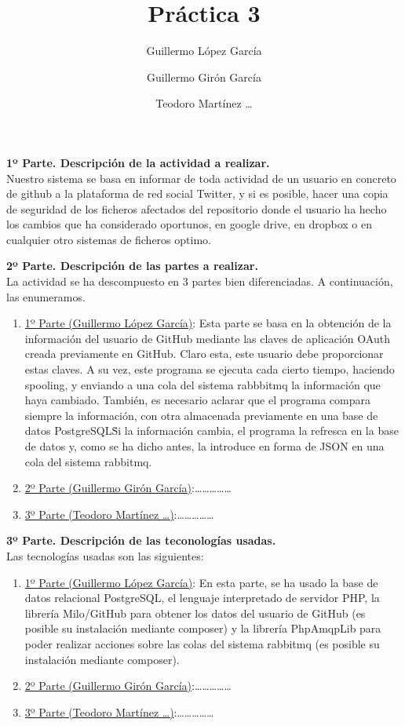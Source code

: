 \documentclass{article}
\title{Práctica 3}
\author{
Guillermo López García
\and
Guillermo Girón García
\and
Teodoro Martínez \ldots
}
\begin{document}
\maketitle
\textbf{1º Parte. Descripción de la actividad a realizar.}\\
Nuestro sistema se basa en informar de toda actividad de un usuario
en concreto de github a la plataforma de red social Twitter, y si es
posible, hacer una copia de seguridad de los ficheros afectados
del repositorio donde el usuario ha hecho los cambios que ha considerado
oportunos, en google drive, en dropbox o en cualquier otro sistemas
de ficheros optimo.

\textbf{2º Parte. Descripción de las partes a realizar.}\\
La actividad se ha descompuesto en 3 partes bien diferenciadas.
A continuación, las enumeramos.
\begin{enumerate}
    \item \underline{1º Parte (Guillermo López García)}: Esta parte se
        basa en la obtención de la información del usuario de GitHub mediante
        las claves de aplicación OAuth creada previamente en GitHub.
        Claro esta, este usuario debe proporcionar estas claves.
        A su vez, este programa se ejecuta cada cierto tiempo, haciendo spooling,
        y enviando a una cola del sistema rabbbitmq la información que haya cambiado.
        También, es necesario aclarar que el programa compara siempre la información,
        con otra almacenada previamente en una base de datos PostgreSQL\. Si la
        información cambia, el programa la refresca en la base de datos y, como se
        ha dicho antes, la introduce en forma de JSON en una cola del sistema
        rabbitmq.
    \item \underline{2º Parte (Guillermo Girón García)}:\ldots\ldots\ldots\ldots\ldots
    \item \underline{3º Parte (Teodoro Martínez \ldots)}:\ldots\ldots\ldots\ldots\ldots
\end{enumerate}

\textbf{3º Parte. Descripción de las teconologías usadas.}\\
Las tecnologías usadas son las siguientes:
\begin{enumerate}
    \item \underline{1º Parte (Guillermo López García)}: En esta parte, se ha usado
        la base de datos relacional PostgreSQL, el lenguaje interpretado de servidor
        PHP, la librería Milo/GitHub para obtener los datos del usuario de GitHub
        (es posible su instalación mediante composer) y la librería PhpAmqpLib para
        poder realizar acciones sobre las colas del sistema rabbitmq (es posible su
        instalación mediante composer).
    \item \underline{2º Parte (Guillermo Girón García)}:\ldots\ldots\ldots\ldots\ldots
    \item \underline{3º Parte (Teodoro Martínez \ldots)}:\ldots\ldots\ldots\ldots\ldots
\end{enumerate}
\end{document}
